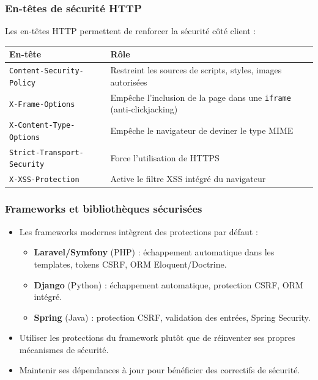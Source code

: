 \documentclass{beamer}
\begin{document}
\begin{frame}[fragile]
\frametitle{En-têtes de sécurité HTTP}

Les en-têtes HTTP permettent de renforcer la sécurité côté client :

\begin{small}
\begin{tabular}{|l|p{6cm}|}
\hline
\textbf{En-tête} & \textbf{Rôle} \\
\hline
\texttt{Content-Security-Policy} & Restreint les sources de scripts, styles, images autorisées \\
\hline
\texttt{X-Frame-Options} & Empêche l'inclusion de la page dans une \texttt{iframe} (anti-clickjacking) \\
\hline
\texttt{X-Content-Type-Options} & Empêche le navigateur de deviner le type MIME \\
\hline
\texttt{Strict-Transport-Security} & Force l'utilisation de HTTPS \\
\hline
\texttt{X-XSS-Protection} & Active le filtre XSS intégré du navigateur \\
\hline
\end{tabular}
\end{small}
\end{frame}


\begin{frame}
\frametitle{Frameworks et bibliothèques sécurisées}

\begin{itemize}
\item Les frameworks modernes intègrent des protections par défaut :
\begin{itemize}
\item \textbf{Laravel/Symfony} (PHP) : échappement automatique dans les templates, tokens CSRF, ORM Eloquent/Doctrine.
\item \textbf{Django} (Python) : échappement automatique, protection CSRF, ORM intégré.
\item \textbf{Spring} (Java) : protection CSRF, validation des entrées, Spring Security.
\end{itemize}
\item \alert{Utiliser les protections du framework} plutôt que de réinventer ses propres mécanismes de sécurité.
\item Maintenir ses dépendances \alert{à jour} pour bénéficier des correctifs de sécurité.
\end{itemize}
\end{frame}


\end{document}
